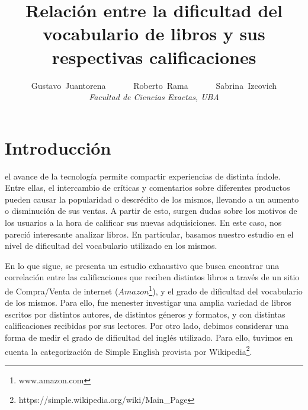 \documentclass[12pt,journal,compsoc]{IEEEtran}
\begin{document}
\title{Relación entre la dificultad del vocabulario de libros y sus respectivas calificaciones}

\author{Gustavo~Juantorena~~~~~~
        Roberto~Rama~~~~~~
        Sabrina~Izcovich\\
        \textit{Facultad de Ciencias Exactas, UBA}}



\maketitle
\IEEEdisplaynontitleabstractindextext
\IEEEpeerreviewmaketitle

\section{Introducción}
 el avance de la tecnología permite compartir experiencias de distinta índole. Entre ellas, el intercambio de críticas y comentarios sobre diferentes productos pueden causar la popularidad o descrédito de los mismos, llevando a un aumento o disminución de sus ventas. A partir de esto, surgen dudas sobre los motivos de los usuarios a la hora de calificar sus nuevas adquisiciones. En este caso, nos pareció interesante analizar libros. En particular, basamos nuestro estudio en el nivel de dificultad del vocabulario utilizado en los mismos. 

En lo que sigue, se presenta un estudio exhaustivo que busca encontrar una correlación entre las calificaciones que reciben distintos libros a través de un sitio de Compra/Venta de internet ($Amazon$\footnote{www.amazon.com}), y el grado de dificultad del vocabulario de los mismos. Para ello, fue menester investigar una amplia variedad de libros escritos por distintos autores, de distintos géneros y formatos, y con distintas calificaciones recibidas por sus lectores. Por otro lado, debimos considerar una forma de medir el grado de dificultad del inglés utilizado. Para ello, tuvimos en cuenta la categorización de Simple English provista por Wikipedia\footnote{https://simple.wikipedia.org/wiki/Main\_Page}.
\end{document}
